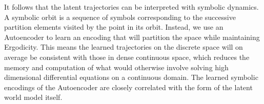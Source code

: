 \documentclass{article}
\begin{document}
It follows that the latent trajectories can be interpreted with symbolic dynamics. A symbolic orbit is a sequence of symbols corresponding to the successive partition elements visited by the point in its orbit. Instead, we use an Autoencoder to learn an encoding that will partition the space while maintaining Ergodicity. This means the learned trajectories on the discrete space will on average be consistent with those in dense continuous space, which reduces the memory and computation of what would otherwise involve solving high dimensional differential equations on a continuous domain. The learned symbolic encodings of the Autoencoder are closely correlated with the form of the latent world model itself.




\end{document}
